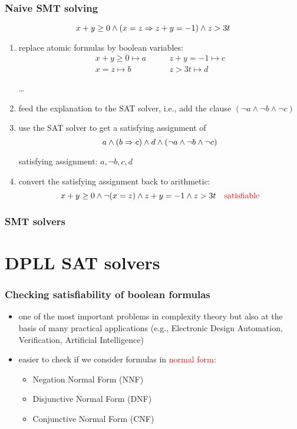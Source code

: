 \documentclass[smaller]{beamer}
\newcommand{\red}[1]{\textcolor{red}{#1}}
\begin{document}
\begin{frame}
\frametitle{Naive SMT solving}
\[
x+y\geq 0\land (x=z\Rightarrow z+y=-1)\land z>3t
\]
\begin{enumerate}
\item replace atomic formulas by boolean variables:
\[
\begin{array}{ll}
x+y\geq 0\mapsto a \quad\quad& z+y=-1\mapsto c\\[2mm]
x=z\mapsto b \quad\quad& z>3t \mapsto d 
\end{array}
\]

\ldots
\setcounter{enumi}{3}
\item feed the explanation to the SAT solver, i.e., add the clause $(\neg a\land \neg b\land \neg c)$
\item use the SAT solver to get a satisfying assignment of 
\[
a\land (b\Rightarrow c)\land d\land (\neg a\land \neg b\land \neg c)
\]

satisfying assignment: $a,\neg b,c,d$
\item convert the satisfying assignment back to arithmetic:
\[
x+y\geq 0\land \neg (x=z)\land z+y=-1\land z>3t
\quad\red{\mbox{satisfiable}}
\]
\end{enumerate}
\end{frame}


\begin{frame}
\frametitle{SMT solvers}
\tableofcontents
\end{frame}

\section{DPLL SAT solvers}

\begin{frame}
\frametitle{Checking satisfiability of boolean formulas}
\begin{itemize}
\setlength\itemsep{2mm}
\item one of the most important problems in complexity theory but also
at the basis of many practical applications (e.g., Electronic Design Automation, 
Verification, Artificial Intelligence)
\item easier to check if we consider formulas in \red{normal form}:
	\begin{itemize}
	\setlength\itemsep{1mm}
		\item Negation Normal Form (NNF)
		\item Disjunctive Normal Form (DNF)
		\item Conjunctive Normal Form (CNF)
	\end{itemize}
\end{itemize}
\end{frame}
\end{document}
